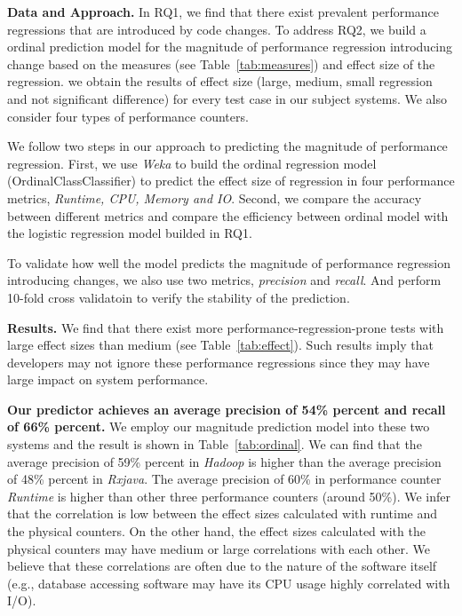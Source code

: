 \textbf{Data and Approach.}
In RQ1, we find that there exist prevalent performance regressions that are introduced by code changes. To address RQ2, we build a ordinal prediction model for the magnitude of performance regression introducing change based on the measures (see Table~\ref{tab:measures}) and effect size of the regression. we obtain the results of effect size (large, medium, small regression and not significant difference) for every test case in our subject systems. We also consider four types of performance counters.

We follow two steps in our approach to predicting the magnitude of performance regression. First, we use \emph{Weka} to build the ordinal regression model (OrdinalClassClassifier) to predict the effect size of regression in four performance metrics, \emph{Runtime, CPU, Memory and IO}. Second, we compare the accuracy between different metrics and compare the efficiency between ordinal model with the logistic regression model builded in RQ1. 

To validate how well the model predicts the magnitude of performance regression introducing changes, we also use two metrics, \emph{precision} and \emph{recall}. And perform 10-fold cross validatoin to verify the stability of the prediction.

\textbf{Results.} We find that there exist more performance-regression-prone tests with large effect sizes than medium (see Table~\ref{tab:effect}). Such results imply that developers may not ignore these performance regressions since they may have large impact on system performance.

\textbf{Our predictor achieves an average precision of 54\% percent and recall of 66\% percent.} We employ our magnitude prediction model into these two systems and the result is shown in Table~\ref{tab:ordinal}. We can find that the average precision of 59\% percent in \emph{Hadoop} is higher than the average precision of 48\% percent in \emph{Rxjava}. The average precision of 60\% in performance counter \emph{Runtime} is higher than other three performance counters (around 50\%).  We infer that the correlation is low between the effect sizes calculated with runtime and the physical counters. On the other hand, the effect sizes calculated with the physical counters may have medium or large correlations with each other. We believe that these correlations are often due to the nature of the software itself (e.g., database accessing software may have its CPU usage highly correlated with I/O).

